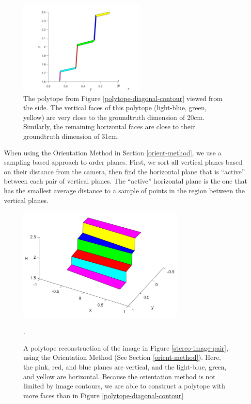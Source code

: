 \begin{figure}[!h]
\centering
\includegraphics[width=2.5in]{Sections/Figures/polytope_sideview.png}
\caption{The polytope from Figure \ref{polytope-diagonal-contour} viewed from the side. The vertical faces of this polytope (light-blue, green, yellow) are very close to the groundtruth dimension of 20cm. Similarly, the remaining horizontal faces are close to their groundtruth dimension of 31cm.}
\label{polytope-sideview-contour}
\end{figure}

When using the Orientation Method in Section \ref{orient-method}, we use a sampling based approach to order planes. First, we sort all vertical planes based on their distance from the camera, then find the horizontal plane that is ``active'' between each pair of vertical planes. The ``active'' horizontal plane is the one that has the smallest average distance to a sample of points in the region between the vertical planes.


\begin{figure}[!h]
\centering
\includegraphics[width=3.3in]{Sections/Figures/polytope_diagonal_geom.jpg}
\caption{A polytope reconstruction of the image in Figure \ref{stereo-image-pair}, using the Orientation Method (See Section \ref{orient-method}). Here, the pink, red, and blue planes are vertical, and the light-blue, green, and yellow are horizontal. Because the orientation method is not limited by image contours, we are able to construct a polytope with more faces than in Figure \ref{polytope-diagonal-contour}}.
\label{polytope-diagonal-orient}
\end{figure}

